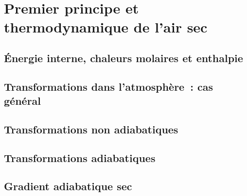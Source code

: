 \mk
\section{Premier principe et thermodynamique de l'air sec} 

\sk
\subsection{\'Energie interne, chaleurs molaires et enthalpie}

	

\sk
\subsection{Transformations dans l'atmosphère~: cas général}

	

\sk
\subsection{Transformations non adiabatiques}

	

\sk
\subsection{Transformations adiabatiques}

	


\sk
\subsection{Gradient adiabatique sec} \label{adiabsec}

